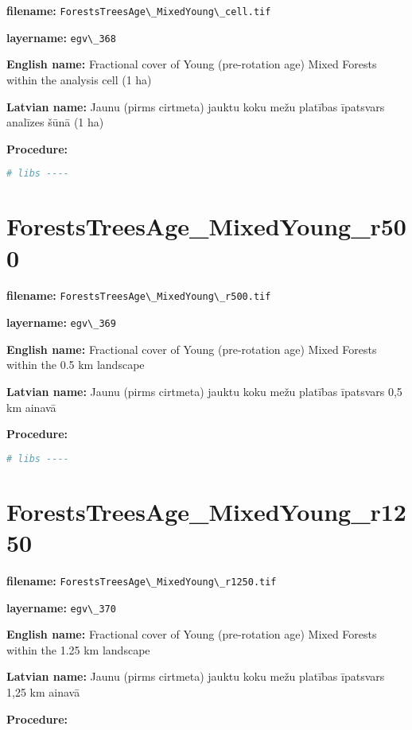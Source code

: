 \documentclass[
]{book}
\newcommand{\passthrough}[1]{#1}
\begin{document}
\textbf{filename:} \passthrough{\lstinline!ForestsTreesAge\_MixedYoung\_cell.tif!}

\textbf{layername:} \passthrough{\lstinline!egv\_368!}

\textbf{English name:} Fractional cover of Young (pre-rotation age) Mixed Forests within the analysis cell (1 ha)

\textbf{Latvian name:} Jaunu (pirms cirtmeta) jauktu koku mežu platības īpatsvars analīzes šūnā (1 ha)

\textbf{Procedure:}

\begin{lstlisting}[language=R]
# libs ----
\end{lstlisting}

\section{ForestsTreesAge\_MixedYoung\_r500}\label{ch06.369}

\textbf{filename:} \passthrough{\lstinline!ForestsTreesAge\_MixedYoung\_r500.tif!}

\textbf{layername:} \passthrough{\lstinline!egv\_369!}

\textbf{English name:} Fractional cover of Young (pre-rotation age) Mixed Forests within the 0.5 km landscape

\textbf{Latvian name:} Jaunu (pirms cirtmeta) jauktu koku mežu platības īpatsvars 0,5 km ainavā

\textbf{Procedure:}

\begin{lstlisting}[language=R]
# libs ----
\end{lstlisting}

\section{ForestsTreesAge\_MixedYoung\_r1250}\label{ch06.370}

\textbf{filename:} \passthrough{\lstinline!ForestsTreesAge\_MixedYoung\_r1250.tif!}

\textbf{layername:} \passthrough{\lstinline!egv\_370!}

\textbf{English name:} Fractional cover of Young (pre-rotation age) Mixed Forests within the 1.25 km landscape

\textbf{Latvian name:} Jaunu (pirms cirtmeta) jauktu koku mežu platības īpatsvars 1,25 km ainavā

\textbf{Procedure:}
\end{document}

